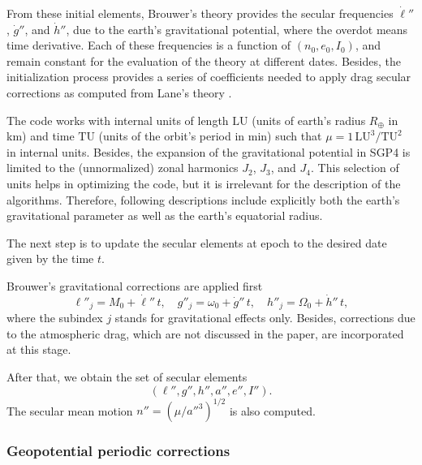 \documentclass{article}
\begin{document}
From these initial elements, Brouwer's theory provides the secular frequencies $\dot\ell''$, $\dot{g}''$, and $\dot{h}''$, due to the earth's gravitational potential, where the overdot means time derivative. Each of these frequencies is a function of $(n_0,e_0,I_0)$, and remain constant for the evaluation of the theory at different dates. Besides, the initialization process provides a series of coefficients needed to apply drag secular corrections as computed from Lane's theory \cite{Lane1965}.
\par

The code works with internal units of length $\mathrm{LU}$ (units of earth's radius $R_\oplus$ in km) and time $\mathrm{TU}$ (units of the orbit's period in min) such that $\mu=1\,\mathrm{LU^3/TU^2}$ in internal units. Besides, the expansion of the gravitational potential in SGP4 is limited to the (unnormalized) zonal harmonics $J_2$, $J_3$, and $J_4$. This selection of units helps in optimizing the code, but it is irrelevant for the description of the algorithms. Therefore, following descriptions include explicitly both the earth's gravitational parameter as well as the earth's equatorial radius.

The next step is to update the secular elements at epoch to the desired date given by the time $t$.

Brouwer's gravitational corrections are applied first
\[
\ell''_j=M_0+\dot\ell''\,t, \quad g''_j=\omega_0+\dot{g}''\,t, \quad h''_j=\Omega_0+\dot{h}''\,t, %
\]
where the subindex $j$ stands for gravitational effects only. Besides, corrections due to the atmospheric drag, which are not discussed in the paper, are incorporated at this stage.

After that, we obtain the set of secular elements
\[
(\ell'',g'',h'',a'',e'',I'').
\]
The secular mean motion $n''=(\mu/a''^3)^{1/2}$ is also computed.

\subsubsection{Geopotential periodic corrections} \label{s:SGP4lp}
\end{document}
